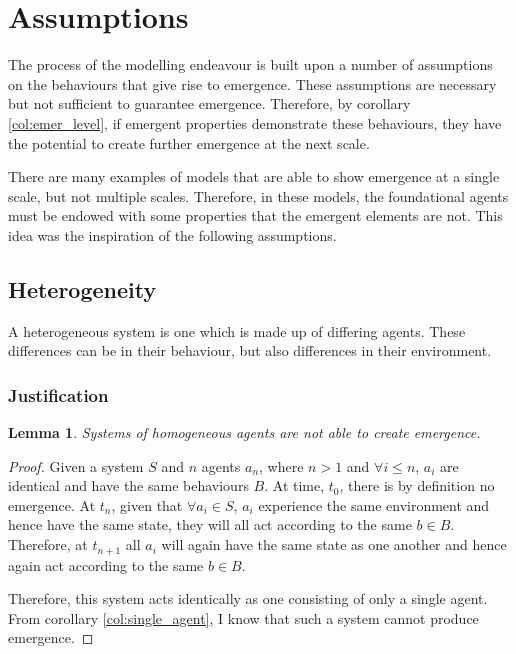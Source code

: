 \documentclass{article}
\newtheorem{lemma}[theorem]{Lemma}
\begin{document}
\section{Assumptions}

The process of the modelling endeavour is built upon a number of assumptions on the behaviours that give rise to emergence. These assumptions are necessary but not sufficient to guarantee emergence. Therefore, by corollary \ref{col:emer_level}, if emergent properties demonstrate these behaviours, they have the potential to create further emergence at the next scale.

      There are many examples of models that are able to show emergence at a single scale, but not multiple scales. Therefore, in these models, the foundational agents must be endowed with some properties that the emergent elements are not. This idea was the inspiration of the following assumptions.

      
  \subsection{Heterogeneity}
  \label{sec: hetro}
  
    A heterogeneous system is one which is made up of differing agents. These differences can be in their behaviour, but also differences in their environment. 

    \subsubsection{Justification}

      \begin{lemma}
        Systems of homogeneous agents are not able to create emergence. 
      \end{lemma}
      \begin{proof}

        Given a system $S$ and $n$ agents $a_n$, where $n > 1$ and $\forall i \leq n$, $a_i$ are identical and have the same behaviours $B$. At time, $t_0$, there is by definition no emergence. At $t_n$, given that $\forall a_i \in S$, $a_i$ experience the same environment and hence have the same state, they will all act according to the same $b \in B$. Therefore, at $t_{n+1}$ all $a_i$ will again have the same state as one another and hence again act according to the same $b \in B$.

        Therefore, this system acts identically as one consisting of only a single agent. From corollary \ref{col:single_agent}, I know that such a system cannot produce emergence.

      \end{proof}
\end{document}
